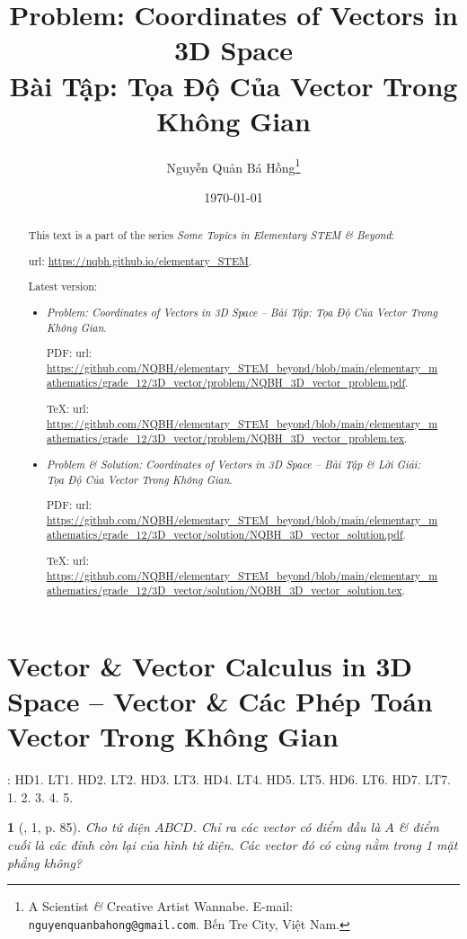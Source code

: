 \documentclass{article}
\title{Problem: Coordinates of Vectors in 3D Space\\Bài Tập: Tọa Độ Của Vector Trong Không Gian}
\author{Nguyễn Quản Bá Hồng\footnote{A Scientist {\it\&} Creative Artist Wannabe. E-mail: {\tt nguyenquanbahong@gmail.com}. Bến Tre City, Việt Nam.}}
\date{\today}
\newtheorem{baitoan}{}
\begin{document}
\maketitle
\begin{abstract}
	This text is a part of the series {\it Some Topics in Elementary STEM \& Beyond}:
	
	{\sc url}: \url{https://nqbh.github.io/elementary_STEM}.
	
	Latest version:
	\begin{itemize}
		\item {\it Problem: Coordinates of Vectors in 3D Space -- Bài Tập: Tọa Độ Của Vector Trong Không Gian}.
		
		PDF: {\sc url}: \url{https://github.com/NQBH/elementary_STEM_beyond/blob/main/elementary_mathematics/grade_12/3D_vector/problem/NQBH_3D_vector_problem.pdf}.
		
		\TeX: {\sc url}: \url{https://github.com/NQBH/elementary_STEM_beyond/blob/main/elementary_mathematics/grade_12/3D_vector/problem/NQBH_3D_vector_problem.tex}.
		\item {\it Problem \& Solution: Coordinates of Vectors in 3D Space -- Bài Tập \& Lời Giải: Tọa Độ Của Vector Trong Không Gian}.
		
		PDF: {\sc url}: \url{https://github.com/NQBH/elementary_STEM_beyond/blob/main/elementary_mathematics/grade_12/3D_vector/solution/NQBH_3D_vector_solution.pdf}.
		
		\TeX: {\sc url}: \url{https://github.com/NQBH/elementary_STEM_beyond/blob/main/elementary_mathematics/grade_12/3D_vector/solution/NQBH_3D_vector_solution.tex}.
	\end{itemize}
\end{abstract}
\tableofcontents


\section{Vector \& Vector Calculus in 3D Space -- Vector \& Các Phép Toán Vector Trong Không Gian}
\cite[Chap. II, \S1, pp. 56--64]{SGK_Toan_12_Canh_Dieu_tap_1}: HD1. LT1. HD2. LT2. HD3. LT3. HD4. LT4. HD5. LT5. HD6. LT6. HD7. LT7. 1. 2. 3. 4. 5.

\begin{baitoan}[\cite{SGK_Toan_11_hinh_hoc_co_ban}, 1, p. 85]
	Cho tứ diện $ABCD$. Chỉ ra các vector có điểm đầu là $A$ \& điểm cuối là các đỉnh còn lại của hình tứ diện. Các vector đó có cùng nằm trong 1 mặt phẳng không?
\end{baitoan}
\end{document}
